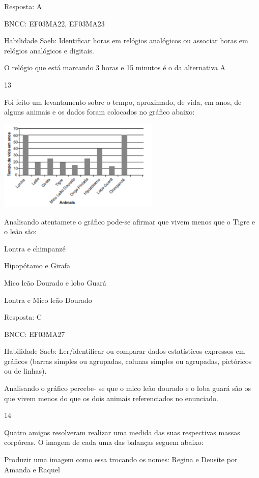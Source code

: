 \begin{escolha}
{\begin{escolha}
{Resposta: A

BNCC: EF03MA22, EF03MA23

Habilidade Saeb: Identificar horas em relógios analógicos ou associar
horas em relógios analógicos e digitais.

O relógio que está marcando 3 horas e 15 minutos é o da alternativa A

\num{13}

Foi feito um levantamento sobre o tempo, aproximado, de vida, em anos,
de alguns animais e os dados foram colocados no gráfico abaixo:

\includegraphics[width=3.02451in,height=1.70004in]{media/image127.png}

Analisando atentamete o gráfico pode-se afirmar que vivem menos que o
Tigre e o leão são:

\begin{escolha}

\item
  Lontra e chimpanzé
\item
  Hipopótamo e Girafa
\item
  Mico leão Dourado e lobo Guará
\item
  Lontra e Mico leão Dourado
\end{escolha}

Resposta: C

BNCC: EF03MA27

Habilidade Saeb: Ler/identificar ou comparar dados estatísticos
expressos em gráficos (barras simples ou agrupadas, colunas simples ou
agrupadas, pictóricos ou de linhas).

Analisando o gráfico percebe- se que o mico leão dourado e o loba guará
são os que vivem menos do que os dois animais referenciados no
enunciado.

\num{14}

Quatro amigos resolveram realizar uma medida das suas respectivas massas
corpóreas. O imagem de cada uma das balanças seguem abaixo:

Produzir uma imagem como essa trocando os nomes: Regina e Deusite por
Amanda e Raquel

}
\end{escolha}}
\end{escolha}

